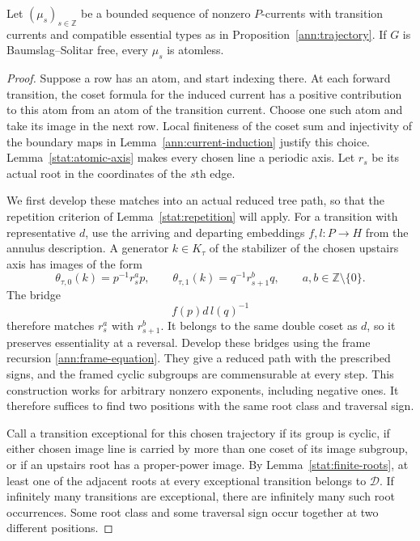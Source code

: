\begin{proposition}\label{stat:no-atoms}
Let $(\mu_s)_{s\in\mathbb Z}$ be a bounded sequence of nonzero
$P$-currents with transition currents and compatible essential types
as in Proposition~\ref{ann:trajectory}.  If $G$ is Baumslag--Solitar
free, every $\mu_s$ is atomless.
\end{proposition}
\begin{proof}
Suppose a row has an atom, and start indexing there.  At each forward
transition, the coset formula for the induced current has a positive
contribution to this atom from an atom of the transition current.
Choose one such atom and take its image in the next row.  Local
finiteness of the coset sum and injectivity of the boundary maps in
Lemma~\ref{ann:current-induction} justify this choice.
Lemma~\ref{stat:atomic-axis} makes every chosen
line a periodic axis.  Let $r_s$ be its actual root in the coordinates
of the $s$th edge.

We first develop these matches into an actual reduced tree path,
so that the repetition criterion of Lemma~\ref{stat:repetition}
will apply.  For a transition
with representative $d$, use the arriving and departing embeddings
$f,l:P\to H$ from the annulus description.  A generator $k\in K_\tau$
of the stabilizer of the chosen upstairs axis has images of the form
\[
 \theta_{\tau,0}(k)=p^{-1}r_s^{a}p,\qquad
 \theta_{\tau,1}(k)=q^{-1}r_{s+1}^{b}q,
 \qquad a,b\in\mathbb Z\setminus\{0\}.
\]
The bridge
\[
                         f(p)d\,l(q)^{-1}
\]
therefore matches $r_s^a$ with $r_{s+1}^b$.  It belongs to the same
double coset as $d$, so it preserves essentiality at a reversal.
Develop these bridges using the frame recursion
\eqref{ann:frame-equation}.  They give a reduced path with the prescribed
signs, and the framed cyclic subgroups are commensurable at every
step.  This construction works for arbitrary nonzero exponents,
including negative ones.  It therefore suffices to find two positions
with the same root class and traversal sign.

Call a transition exceptional for this chosen trajectory if its group
is cyclic, if either chosen image line is carried by more than one
coset of its image subgroup, or if an upstairs root has a
proper-power image.  By Lemma~\ref{stat:finite-roots}, at least one
of the adjacent roots at every exceptional transition belongs to
$\mathcal D$.  If infinitely many transitions are exceptional, there
are infinitely many such root occurrences.  Some root class and some
traversal sign occur together at two different positions.


\end{proof}
